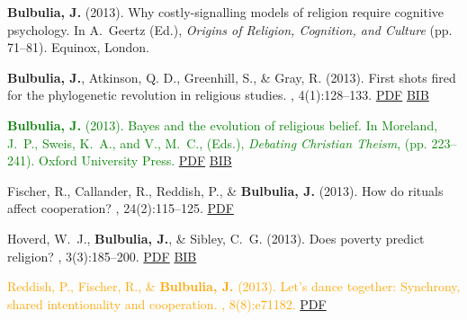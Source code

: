 \documentclass{article}
\begin{document}
\begin{thebibliography}{99}
{\bf Bulbulia, J.} (2013).
\newblock Why costly-signalling models of religion require cognitive
  psychology.
\newblock In A.~Geertz (Ed.), {\em Origins of Religion, Cognition, and
  Culture} (pp. 71--81). Equinox, London. %


{\bf Bulbulia, J.}, Atkinson, Q. D., Greenhill, S., \& Gray, R. (2013).
\newblock First shots fired for the phylogenetic revolution in religious
  studies.
, 4(1):128--133.
\href{http://escholarship.org/uc/item/05n4z9w8#page-27}{PDF} \href{https://www.dropbox.com/s/hyj3r479lot4u54/2013.Bulbulia.First.Shots..bib?dl=0}{BIB}


\textcolor{Green}{
{\bf Bulbulia, J.} (2013).
\newblock Bayes and the evolution of religious belief.
\newblock In Moreland, J.~P., Sweis, K.~A., and V., M.~C., (Eds.), {\em
  Debating Christian Theism}, (pp. 223--241). Oxford University
  Press. } \href{https://www.dropbox.com/s/4r51rkx6hs45xv5/Bayes_Bulbulia.pdf}{PDF} \href{https://www.dropbox.com/s/bvynsi68no2bywu/2013.bulbulia.bayes.bib?dl=0}{BIB}


Fischer, R., Callander, R., Reddish, P., \& {\bf Bulbulia, J.} (2013).
\newblock How do rituals affect cooperation?
, 24(2):115--125.
\href{https://www.dropbox.com/s/isz3hm6j46x15jv/10.1007_s12110-013-9167-y.pdf}{PDF} %


Hoverd, W.~J., {\bf Bulbulia, J.}, \& Sibley, C.~G. (2013).
\newblock Does poverty predict religion?
, 3(3):185--200. \href{https://www.dropbox.com/s/vfc656k50e30u1c/pov_published.pdf}{PDF} \href{https://www.dropbox.com/s/sqjldzyphdvxi6q/2013.pov.bib?dl=0}{BIB}


\textcolor{Orange}{Reddish, P., Fischer, R., \& {\bf Bulbulia, J.} (2013).
\newblock Let's dance together: Synchrony, shared intentionality and
  cooperation.
, 8(8):e71182.} 
\href{https://www.dropbox.com/s/qhcenknup2xtetx/journal.pone.0071182.pdf}{PDF} %



\end{thebibliography}
\end{document}
